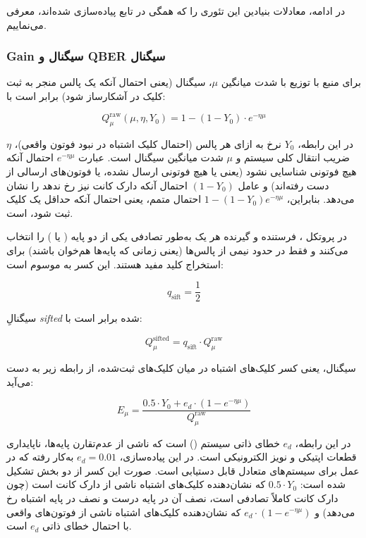 در ادامه، معادلات بنیادین این تئوری را که همگی در تابع  پیاده‌سازی شده‌اند، معرفی می‌نماییم.

\subsubsection{Gain سیگنال و QBER سیگنال}

برای منبع  با توزیع  با شدت میانگین $\mu$،  سیگنال (یعنی احتمال آنکه یک پالس منجر به ثبت کلیک در آشکارساز شود) برابر است با:

\begin{equation}
	Q_\mu^{\text{raw}}(\mu, \eta, Y_0) = 1 - (1 - Y_0) \cdot e^{-\eta \mu}
\end{equation}

در این رابطه، $Y_0$ نرخ  به ازای هر پالس (احتمال کلیک اشتباه در نبود فوتون واقعی)، $\eta$ ضریب انتقال کلی سیستم و $\mu$ شدت میانگین سیگنال است. عبارت $e^{-\eta \mu}$ احتمال آنکه هیچ فوتونی شناسایی نشود (یعنی یا هیچ فوتونی ارسال نشده، یا فوتون‌های ارسالی از دست رفته‌اند) و عامل $(1 - Y_0)$ احتمال آنکه دارک کانت نیز رخ ندهد را نشان می‌دهد. بنابراین، $1 - (1-Y_0) e^{-\eta \mu}$ احتمال متمم، یعنی احتمال آنکه حداقل یک کلیک ثبت شود، است.

در پروتکل ، فرستنده و گیرنده هر یک به‌طور تصادفی یکی از دو پایه ( یا ) را انتخاب می‌کنند و فقط در حدود نیمی از پالس‌ها (یعنی زمانی که پایه‌ها هم‌خوان باشند) برای استخراج کلید مفید هستند. این کسر به  موسوم است:

\begin{equation}
	q_{\text{sift}} = \frac{1}{2}
\end{equation}

 سیگنالِ \emph{sifted} شده برابر است با:

\begin{equation}
	Q_\mu^{\text{sifted}} = q_{\text{sift}} \cdot Q_\mu^{\text{raw}}
\end{equation}

 سیگنال، یعنی کسر کلیک‌های اشتباه در میان کلیک‌های ثبت‌شده، از رابطه زیر به دست می‌آید:

\begin{equation}
	E_\mu = \frac{0.5 \cdot Y_0 + e_d \cdot (1 - e^{-\eta \mu})}{Q_\mu^{\text{raw}}}
\end{equation}

در این رابطه، $e_d$ خطای ذاتی سیستم () است که ناشی از عدم‌تقارن پایه‌ها، ناپایداری قطعات اپتیکی و نویز الکترونیکی است. در این پیاده‌سازی، $e_d = 0.01$ به‌کار رفته که در عمل برای سیستم‌های متعادل قابل دستیابی است. صورت این کسر از دو بخش تشکیل شده است: $0.5 \cdot Y_0$ که نشان‌دهنده کلیک‌های اشتباه ناشی از دارک کانت است (چون دارک کانت کاملاً تصادفی است، نصف آن در پایه درست و نصف در پایه اشتباه رخ می‌دهد) و $e_d \cdot (1 - e^{-\eta \mu})$ که نشان‌دهنده کلیک‌های اشتباه ناشی از فوتون‌های واقعی با احتمال خطای ذاتی $e_d$ است.

